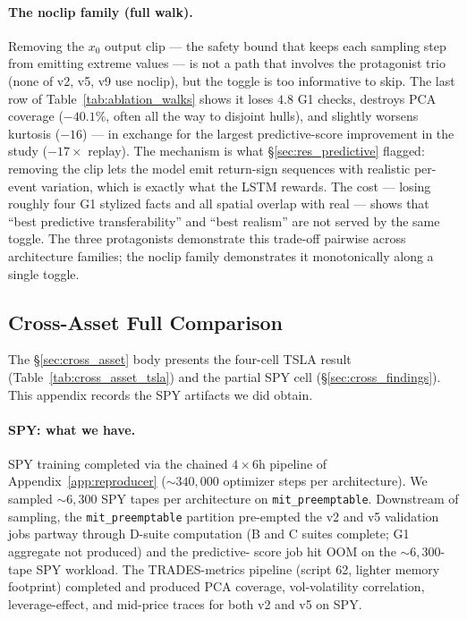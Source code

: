 \documentclass[journal]{IEEEtran}
\theoremstyle{definition}   %
\begin{document}
\paragraph{The noclip family (full walk).}
Removing the $x_0$ output clip --- the safety bound that keeps
each sampling step from emitting extreme values --- is not a path
that involves the protagonist trio (none of v2, v5, v9 use noclip),
but the toggle is too informative to skip. The last row of
Table~\ref{tab:ablation_walks} shows it loses $4.8$ G1 checks,
destroys PCA coverage ($-40.1\%$, often all the way to disjoint
hulls), and slightly worsens kurtosis ($-16$) --- in exchange for
the largest predictive-score improvement in the study
($-17\times$ replay). The mechanism is what
\S\ref{sec:res_predictive} flagged: removing the clip lets
the model emit return-sign sequences with realistic per-event
variation, which is exactly what the LSTM rewards. The cost ---
losing roughly four G1 stylized facts and all spatial overlap with
real --- shows that ``best predictive transferability'' and ``best
realism'' are not served by the same toggle. The three
protagonists demonstrate this trade-off pairwise across
architecture families; the noclip family demonstrates it
monotonically along a single toggle.

\subsection{Cross-Asset Full Comparison}
\label{app:cross_asset_full}

The §\ref{sec:cross_asset} body presents the four-cell TSLA result
(Table~\ref{tab:cross_asset_tsla}) and the partial SPY cell
(\S\ref{sec:cross_findings}). This appendix records the SPY
artifacts we did obtain.

\paragraph{SPY: what we have.}
SPY training completed via the chained $4 \times 6$h pipeline of
Appendix~\ref{app:reproducer} ($\sim 340{,}000$ optimizer steps per
architecture). We sampled $\sim 6{,}300$ SPY tapes per architecture
on \texttt{mit\_preemptable}. Downstream of sampling, the
\texttt{mit\_preemptable} partition pre-empted the v2 and v5
validation jobs partway through D-suite computation (B and C
suites complete; G1 aggregate not produced) and the predictive-
score job hit OOM on the $\sim 6{,}300$-tape SPY workload. The
TRADES-metrics pipeline (script 62, lighter memory footprint)
completed and produced PCA coverage, vol-volatility correlation,
leverage-effect, and mid-price traces for both v2 and v5 on SPY.
\end{document}
